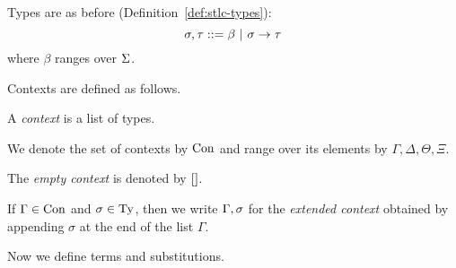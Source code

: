 \begin{comment}
Problem with traditional presentation: there are complications with substitution, making the formalism complicated (cf. remark in Chapter 2). Solution: use de Bruijn indices.

Problem: it is still quite technical to define substitution. Solution: make substitution part of the syntax (explicit substitutions). Also need typing for substitutions, and additional conversion laws for terms and substitutions.
Maybe motivation: having substitutions be part of the syntax (and not operations defined on the syntax) makes it clearer how to deal with them semantically.
\end{comment}

Types are as before (Definition~\ref{def:stlc-types}):
\[ \sigma, \tau ::= \beta \ |\  \sigma \to \tau \]
where $\beta$ ranges over $\Sigma$.

Contexts are defined as follows.

\begin{defn}[Context]
A \emph{context} is a list of types.
\end{defn}

\begin{notn}
\begin{enum}
\item We denote the set of contexts by $\mathrm{Con}$ and range over its elements by $\Gamma, \Delta, \Theta, \Xi$.
\item The \emph{empty context} is denoted by ${[]}$.
\item If $\Gamma \in \mathrm{Con}$ and $\sigma \in \mathrm{Ty}$, then we write $\Gamma, \sigma$ for the \emph{extended context} obtained by appending $\sigma$ at the end of the list $\Gamma$.
\end{enum}
\end{notn}

Now we define terms and substitutions.

